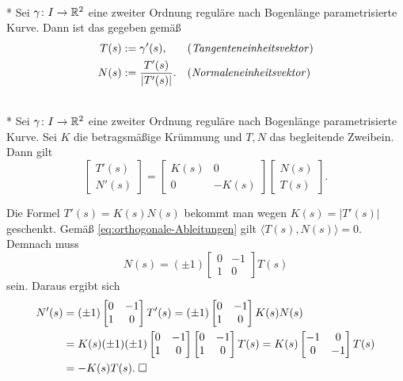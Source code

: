 \begin{definition}\mbox{}\\*
Sei $\gamma\colon I\to\mathbb R^2$ eine zweiter Ordnung reguläre
nach Bogenlänge parametrisierte Kurve. Dann ist das
 gegeben gemäß
\begin{align}
T(s) &:= \gamma'(s), && \text{(\emph{Tangenteneinheitsvektor})}\\
N(s) &:= \frac{T'(s)}{|T'(s)|}. && \text{(\emph{Normaleneinheitsvektor})}
\end{align}
\end{definition}

\begin{theorem}\mbox{}\\*
Sei $\gamma\colon I\to\mathbb R^2$ eine zweiter Ordnung reguläre nach
Bogenlänge parametrisierte Kurve. Sei $K$ die betragsmäßige
Krümmung und $T,N$ das begleitende Zweibein. Dann gilt%
\begin{equation}
\begin{bmatrix}
T'(s)\\ N'(s)
\end{bmatrix}
= \begin{bmatrix}
K(s)  & 0\\
0 & -K(s)
\end{bmatrix}\begin{bmatrix}
N(s)\\ T(s)
\end{bmatrix}.
\end{equation}
\end{theorem}

\noindent{}
Die Formel $T'(s) = K(s)N(s)$ bekommt man wegen $K(s)=|T'(s)|$
geschenkt. Gemäß \eqref{eq:orthogonale-Ableitungen} gilt
$\langle T(s),N(s)\rangle=0$. Demnach muss
\begin{equation}
N(s) = (\pm 1)\begin{bmatrix}0 & -1\\ 1 & 0\end{bmatrix}T(s)
\end{equation}
sein. Daraus ergibt sich
\begin{align}
N'(s) &= (\pm 1)\begin{bmatrix}0 & -1\\ 1 & 0\end{bmatrix}T'(s)
= (\pm 1)\begin{bmatrix}0 & -1\\ 1 & 0\end{bmatrix}K(s)N(s)\\
&= K(s)(\pm 1)(\pm 1)\begin{bmatrix}0 & -1\\ 1 & 0\end{bmatrix}
  \begin{bmatrix}0 & -1\\ 1 & 0\end{bmatrix}T(s)
= K(s)\begin{bmatrix}-1 & 0\\ 0 & -1\end{bmatrix}T(s)\\
&= -K(s)T(s).\;\Box
\end{align}

